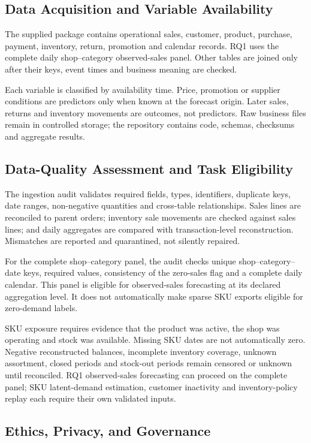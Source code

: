 \documentclass[a4paper,11pt,oneside]{book}
\theoremstyle{plain}
\theoremstyle{definition}
\theoremstyle{remark}
\begin{document}
\subsection{Data Acquisition and Variable Availability}
The supplied package contains operational sales, customer, product, purchase,
payment, inventory, return, promotion and calendar records. RQ1 uses the
complete daily shop--category observed-sales panel. Other tables are joined
only after their keys, event times and business meaning are checked.

Each variable is classified by availability time. Price, promotion or supplier
conditions are predictors only when known at the forecast origin. Later sales,
returns and inventory movements are outcomes, not predictors. Raw business
files remain in controlled storage; the repository contains code, schemas,
checksums and aggregate results.

\subsection{Data-Quality Assessment and Task Eligibility}
The ingestion audit validates required fields, types, identifiers, duplicate
keys, date ranges, non-negative quantities and cross-table relationships.
Sales lines are reconciled to parent orders; inventory sale movements are
checked against sales lines; and daily aggregates are compared with
transaction-level reconstruction. Mismatches are reported and quarantined,
not silently repaired.

For the complete shop--category panel, the audit checks unique
shop--category--date keys, required values, consistency of the zero-sales
flag and a complete daily calendar. This panel is eligible for observed-sales
forecasting at its declared aggregation level. It does not automatically
make sparse SKU exports eligible for zero-demand labels.

SKU exposure requires evidence that the product was active, the shop was
operating and stock was available. Missing SKU dates are not automatically
zero. Negative reconstructed balances, incomplete inventory coverage,
unknown assortment, closed periods and stock-out periods remain censored
or unknown until reconciled. RQ1 observed-sales forecasting can proceed on
the complete panel; SKU latent-demand estimation, customer inactivity and
inventory-policy replay each require their own validated inputs.

\subsection{Ethics, Privacy, and Governance}
\end{document}
